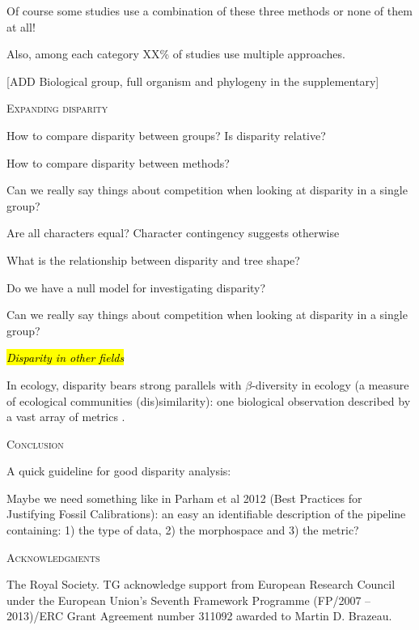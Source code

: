 \documentclass[12pt,letterpaper]{article}
\renewcommand{\section}[1]{%
\bigskip
\begin{center}
\begin{Large}
\normalfont\scshape #1
\medskip
\end{Large}
\end{center}}
\begin{document}
Of course some studies use a combination of these three methods or none of them at all!

Also, among each category XX\% of studies use multiple approaches.

[ADD Biological group, full organism and phylogeny in the supplementary]

\section{Expanding disparity}

How to compare disparity between groups? Is disparity relative?

How to compare disparity between methods?

Can we really say things about competition when looking at disparity in a single group?

Are all characters equal? Character contingency suggests otherwise

What is the relationship between disparity and tree shape?

Do we have a null model for investigating disparity?

Can we really say things about competition when looking at disparity in a single group?


\noindent \hl{\textit{Disparity in other fields}}

In ecology, disparity bears strong parallels with $\beta$-diversity in ecology (a measure of ecological communities (dis)similarity): one biological observation described by a vast array of metrics \citep{baselga2010partitioning, anderson2011navigating, donohue2016navigating}.

\section{Conclusion}

A quick guideline for good disparity analysis:

Maybe we need something like in Parham et al 2012 (Best Practices for Justifying Fossil Calibrations): an easy an identifiable description of the pipeline containing: 1) the type of data, 2) the morphospace and 3) the metric? 

\section{Acknowledgments}
The Royal Society.
TG acknowledge support from European Research Council under the European Union's Seventh Framework Programme (FP/2007 – 2013)/ERC Grant Agreement number 311092 awarded to Martin D. Brazeau.




\end{document}
